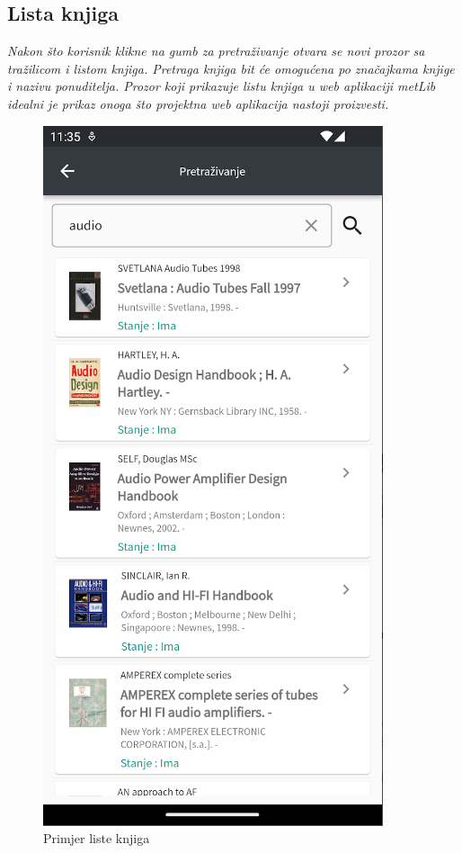 	\subsection{Lista knjiga}
	
	\textit{Nakon što korisnik klikne na gumb za pretraživanje otvara se novi prozor sa tražilicom i listom knjiga. Pretraga knjiga bit će omogućena po značajkama knjige i nazivu ponuditelja. Prozor koji prikazuje listu knjiga u web aplikaciji metLib idealni je prikaz onoga što projektna web aplikacija nastoji proizvesti.}
	
	\begin{figure}[H]
		\includegraphics[scale=0.4]{slike/BookList.PNG} %
		\centering
		\caption{Primjer liste knjiga}
		\label{fig:lista knjiga}
	\end{figure}
	
